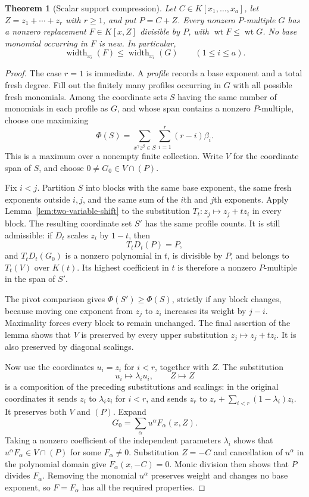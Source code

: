\documentclass[11pt]{article}
\DeclareMathOperator{\wt}{wt}\DeclareMathOperator{\ord}{ord}
\numberwithin{equation}{section}
\newtheorem{theorem}{Theorem}[section]
\theoremstyle{definition}\newtheorem{definition}[theorem]{Definition}
\theoremstyle{remark}\newtheorem{remark}[theorem]{Remark}
\begin{document}
\begin{theorem}[Scalar support compression]\label{thm:compression}
Let $C\in K[x_1,\ldots,x_a]$, let $Z=z_1+\cdots+z_r$ with $r\ge1$,
and put $P=C+Z$. Every nonzero $P$-multiple $G$ has a nonzero replacement
$F\in K[x,Z]$ divisible by $P$, with $\wt F\le\wt G$.
No base monomial occurring in $F$ is new. In particular,
\[
 \operatorname{width}_{x_i}(F)\le
 \operatorname{width}_{x_i}(G)\qquad(1\le i\le a).
\]
\end{theorem}
\begin{proof}
The case $r=1$ is immediate. A \emph{profile} records a base exponent
and a total fresh degree. Fill out the finitely many profiles
occurring in $G$ with all possible fresh monomials. Among the
coordinate sets $S$ having the same number of monomials in each
profile as $G$, and whose span contains a nonzero $P$-multiple,
choose one maximizing
\[
 \Phi(S)=\sum_{x^\gamma z^\beta\in S}
                 \sum_{i=1}^r(r-i)\beta_i.
\]
This is a maximum over a nonempty finite collection. Write $V$ for
the coordinate span of $S$, and choose $0\ne G_0\in V\cap(P)$.

Fix $i<j$. Partition $S$ into blocks with the same base exponent,
the same fresh exponents outside $i,j$, and the same sum of the
$i$th and $j$th exponents. Apply Lemma~\ref{lem:two-variable-shift}
to the substitution $T_t:z_j\mapsto z_j+tz_i$ in every block.
The resulting coordinate set $S'$ has the same profile counts.
It is still admissible: if $D_t$ scales $z_i$ by $1-t$, then
\[
 T_tD_t(P)=P,
\]
and $T_tD_t(G_0)$ is a nonzero polynomial in $t$, is divisible by
$P$, and belongs to $T_t(V)$ over $K(t)$. Its highest coefficient
in $t$ is therefore a nonzero $P$-multiple in the span of $S'$.

The pivot comparison gives $\Phi(S')\ge\Phi(S)$, strictly if any
block changes, because moving one exponent from $z_j$ to $z_i$
increases its weight by $j-i$. Maximality forces every block to
remain unchanged. The final assertion of the lemma shows that $V$
is preserved by every upper substitution $z_j\mapsto z_j+tz_i$.
It is also preserved by diagonal scalings.

Now use the coordinates $u_i=z_i$ for $i<r$, together with $Z$.
The substitution
\[
 u_i\mapsto\lambda_i u_i,\qquad Z\mapsto Z
\]
is a composition of the preceding substitutions and scalings:
in the original coordinates it sends $z_i$ to $\lambda_i z_i$
for $i<r$, and sends $z_r$ to
$z_r+\sum_{i<r}(1-\lambda_i)z_i$. It preserves both $V$ and $(P)$.
Expand
\[
 G_0=\sum_\alpha u^\alpha F_\alpha(x,Z).
\]
Taking a nonzero coefficient of the independent parameters
$\lambda_i$ shows that $u^\alpha F_\alpha\in V\cap(P)$ for some
$F_\alpha\ne0$. Substitution $Z=-C$ and cancellation of $u^\alpha$
in the polynomial domain give $F_\alpha(x,-C)=0$. Monic division
then shows that $P$ divides $F_\alpha$. Removing the monomial
$u^\alpha$ preserves weight and changes no base exponent, so
$F=F_\alpha$ has all the required properties.
\end{proof}
\end{document}
